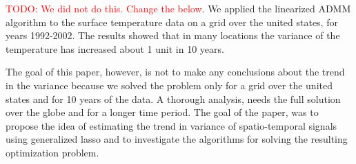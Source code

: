 \documentclass{article}
\newcommand{\attn}[1]{\textcolor{red}{TODO: #1}}
\begin{document}
\attn{We did not do this. Change the below.}
We applied the linearized ADMM algorithm to the surface temperature
data on a grid over the united states, for years 1992-2002. The
results showed that in many locations the variance of the temperature
has increased about 1 unit in 10 years. 

The goal of this paper, however, is not to make any conclusions about
the trend in the variance because we solved the problem only for a
grid over the united states and for 10 years of the data. A thorough
analysis, needs the full solution over the globe and for a longer time
period. The goal of the paper, was to propose the idea of estimating
the trend in variance of spatio-temporal signals using generalized
lasso and to investigate the algorithms for solving the resulting
optimization problem. 


 


\small

\end{document}
